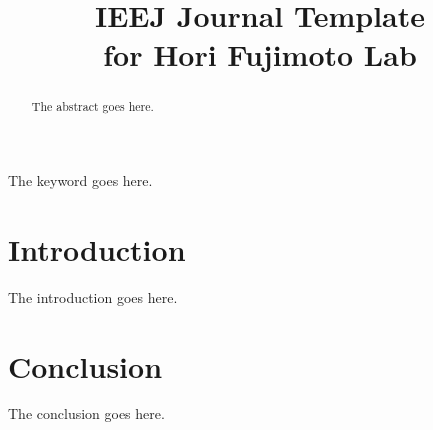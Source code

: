 \documentclass[english]{ieej-e}
\title{IEEJ Journal Template\\for Hori Fujimoto Lab}
\begin{document}
\begin{abstract}
    The abstract goes here.
\end{abstract}

\begin{keyword}
    The keyword goes here.
\end{keyword}

\maketitle

\section{Introduction}
The introduction goes here.

\section{Conclusion}
The conclusion goes here.




\begin{biography}




\end{biography}
\end{document}
